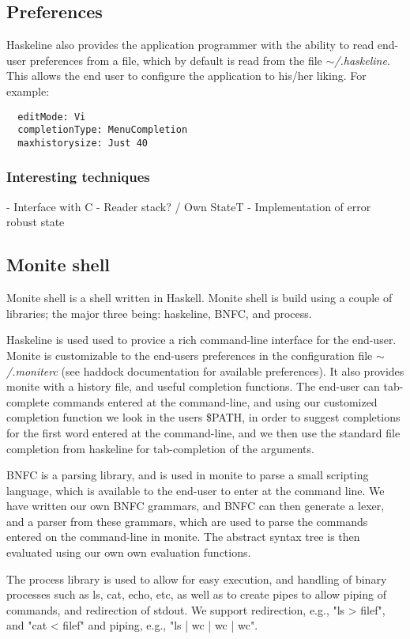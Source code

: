 \documentclass[11pt,a4paper]{article}
\begin{document}
\subsection{Preferences}
Haskeline also provides the application programmer with the ability to read
end-user preferences from a file, which by default is read from the file
$\mathtt{\sim}$\textit{/.haskeline}. This allows the end user to configure the
application to his/her liking. For example:

\begin{verbatim}
  editMode: Vi
  completionType: MenuCompletion
  maxhistorysize: Just 40
\end{verbatim}

\subsubsection{Interesting techniques}
- Interface with C
- Reader stack? / Own StateT
- Implementation of error robust state


\subsection{Monite shell}
Monite shell is a shell written in Haskell. Monite shell is build using a couple
of libraries; the major three being: haskeline, BNFC, and process.

Haskeline is used used to provice a rich command-line interface for the
end-user. Monite is customizable to the end-users preferences in the
configuration file $\mathtt{\sim}$\textit{/.moniterc} (see haddock documentation
for available preferences). It also provides monite with a history file, and
useful completion functions. The end-user can tab-complete commands entered at
the command-line, and using our customized completion function we look in the
users \$PATH, in order to suggest completions for the first word entered at the
command-line, and we then use the standard file completion from haskeline for
tab-completion of the arguments.

BNFC is a parsing library, and is used in monite to parse a small scripting
language, which is available to the end-user to enter at the command line. We
have written our own BNFC grammars, and BNFC can then generate a lexer, and a
parser from these grammars, which are used to parse the commands entered on the
command-line in monite. The abstract syntax tree is then evaluated using our own
own evaluation functions.

The process library is used to allow for easy execution, and handling of binary
processes such as ls, cat, echo, etc, as well as to create pipes to allow
piping of commands, and redirection of stdout. We support redirection, e.g.,
"ls > filef", and "cat < filef" and piping, e.g., "ls | wc | wc | wc".
\end{document}
